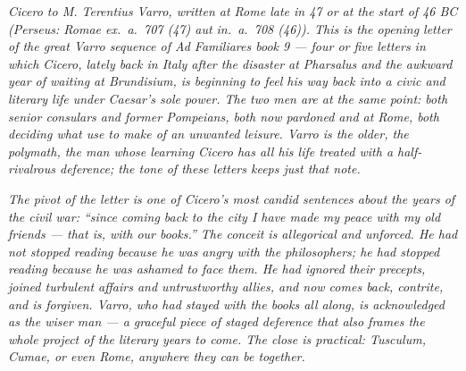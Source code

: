 
\textit{Cicero to M. Terentius Varro, written at Rome late in 47
or at the start of 46 BC (Perseus: \textit{Romae ex.~a.~707 (47)
aut in.~a.~708 (46)}). This is the opening letter of the great
Varro sequence of \textit{Ad Familiares} book 9 --- four or five
letters in which Cicero, lately back in Italy after the disaster
at Pharsalus and the awkward year of waiting at Brundisium, is
beginning to feel his way back into a civic and literary life
under Caesar's sole power. The two men are at the same point:
both senior consulars and former Pompeians, both now pardoned
and at Rome, both deciding what use to make of an unwanted
leisure. Varro is the older, the polymath, the man whose
learning Cicero has all his life treated with a half-rivalrous
deference; the tone of these letters keeps just that note.}

\textit{The pivot of the letter is one of Cicero's most candid
sentences about the years of the civil war: ``since coming back
to the city I have made my peace with my old friends --- that
is, with our books.'' The conceit is allegorical and unforced.
He had not stopped reading because he was angry with the
philosophers; he had stopped reading because he was ashamed to
face them. He had ignored their precepts, joined turbulent
affairs and untrustworthy allies, and now comes back, contrite,
and is forgiven. Varro, who had stayed with the books all along,
is acknowledged as the wiser man --- a graceful piece of staged
deference that also frames the whole project of the literary
years to come. The close is practical: Tusculum, Cumae, or even
Rome, anywhere they can be together.}
